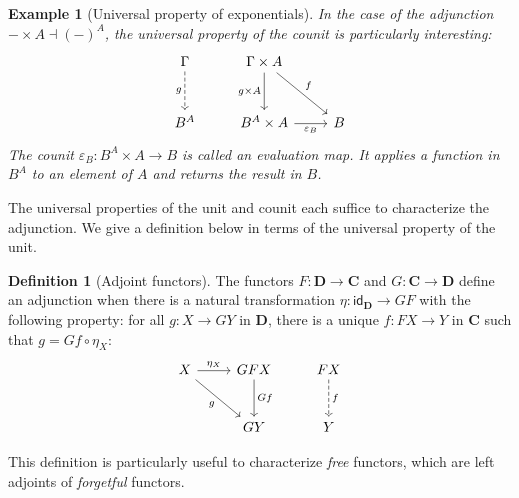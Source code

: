 \documentclass[11pt,oneside]{book}
\newtheorem{example}[theorem]{Example}
\theoremstyle{definition}
\newtheorem{definition}[theorem]{Definition}
\newcommand{\kw}[1]{\ensuremath{ \mathsf{#1} }}
\begin{document}
\begin{example}[Universal property of exponentials] \label{ex:upexp} %
In the case of the adjunction $- \times A \dashv (-)^A$,
the universal property of the counit
is particularly interesting:
\[
  \begin{tikzcd}[row sep=large]
    \Gamma
      \ar[d, "g"', dashed] &
    \Gamma \times A
      \ar[d, "g \times A"']
      \ar[dr, "f"] &
    \\
    B^A &
    B^A \times A
      \ar[r, "\varepsilon_B"'] &
    B
  \end{tikzcd}
\]
The counit $\varepsilon_B : B^A \times A \rightarrow B$
is called an \emph{evaluation map}.
It applies a function in $B^A$ to an element of $A$
and returns the result in $B$.
\end{example}

The universal properties
of the unit and counit
each suffice to characterize the adjunction.
We give a definition below
in terms of the universal property of the unit.

\begin{definition}[Adjoint functors] \label{def:adj} %
The functors $F : \mathbf{D} \rightarrow \mathbf{C}$
and $G : \mathbf{C} \rightarrow \mathbf{D}$
define an adjunction
when there is a natural transformation
$\eta : \kw{id}_\mathbf{D} \rightarrow GF$
with the following property:
for all $g : X \rightarrow G Y$ in $\mathbf{D}$,
there is a unique $f : F X \rightarrow Y$ in $\mathbf{C}$
such that $g = G f \circ \eta_X$:
\[
  \begin{tikzcd}[row sep=large]
    X \ar[r, "\eta_X"] \ar[dr, "g"'] &
    G F X \ar[d, "G f"] &
    F X \ar[d, "f", dashed]
    \\ &
    G Y & Y
  \end{tikzcd}
\]
\end{definition}

This definition is particularly useful
to characterize \emph{free} functors,
which are left adjoints
of \emph{forgetful} functors.
\end{document}
